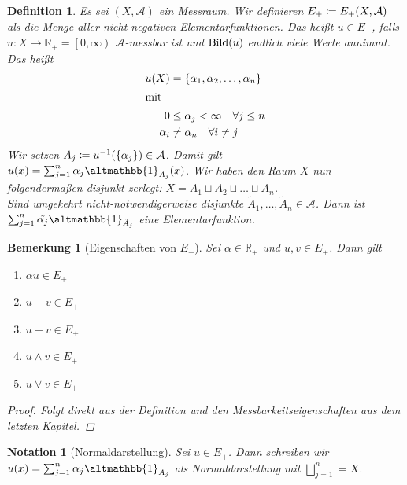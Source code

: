 \documentclass[11pt, twoside, a4paper]{article}
\theoremstyle{plain}
\newtheorem{bemerkung}[blockelement]{Bemerkung}
\newtheorem{definition}[blockelement]{Definition}
\newtheorem{notation}[blockelement]{Notation}
\numberwithin{equation}{subsection}
\newcommand{\set}[1]{\left\{#1\right\}}
\newcommand{\pair}[1]{\left(#1\right)}
\newcommand{\of}[1]{\mathopen{}\mathclose{}\bgroup\left(#1\aftergroup\egroup\right)}
\newcommand{\linterv}[1]{\left[#1\right)}
\newcommand{\charfunc}{\altmathbb{1}}
\DeclareMathOperator{\bild}{Bild}
\newcommand{\R}{\mathbb{R}}
\newcommand{\mA}{\mathcal{A}}
\begin{document}
    \begin{definition}
        Es sei $\pair{X, \mA}$ ein Messraum. Wir definieren $E_+ \coloneqq E_+\of{X, \mA}$ als die Menge aller nicht-negativen Elementarfunktionen. Das heißt $u\in E_+$, falls $u: X \to \R_+ = \linterv{0, \infty}$ $\mA$-messbar ist und $\bild\of{u}$ endlich viele Werte annimmt. Das heißt
        \begin{align*}
            u\of{X} &= \set{\alpha_1, \alpha_2, \ldots, \alpha_n}\\
            \intertext{mit}
            0&\leq \alpha_j < \infty\quad\forall j \leq n\\
            \alpha_i &\neq \alpha_n\quad\forall i\neq j
        \end{align*}
        Wir setzen $A_j \coloneqq u^{-1}\of{\set{\alpha_j}} \in \mA$. Damit gilt $u\of{x} = \sum_{j=1}^{n} \alpha_j \charfunc_{A_j}\of{x}$. Wir haben den Raum $X$ nun folgendermaßen disjunkt zerlegt: $X= A_1 \sqcup A_2 \sqcup \dots \sqcup A_n$.\\
        Sind umgekehrt nicht-notwendigerweise disjunkte $\tilde{A}_1, \ldots, \tilde{A}_n \in \mA$. Dann ist $ \sum_{j=1}^{n} \tilde{\alpha_j} \charfunc_{\tilde{A}_j}$ eine Elementarfunktion.
    \end{definition}

    \begin{bemerkung}[Eigenschaften von $E_+$]
        Sei $\alpha \in \R_+$ und $u, v\in E_+$. Dann gilt
        \begin{enumerate}[label=-]
            \item $\alpha u\in E_+$
            \item $u + v \in E_+$
            \item $u - v\in E_+$
            \item $u \land v \in E_+$
            \item $u\lor v\in E_+$
        \end{enumerate}

        \begin{proof}
            Folgt direkt aus der Definition und den Messbarkeitseigenschaften aus dem letzten Kapitel.
        \end{proof}
    \end{bemerkung}

    \begin{notation}[Normaldarstellung]
        Sei $u \in E_+$. Dann schreiben wir $u\of{x} = \sum_{j=1}^{n} \alpha_j \charfunc_{A_j}$ als Normaldarstellung mit $\bigsqcup_{j=1}^n = X$.
    \end{notation}
\end{document}
